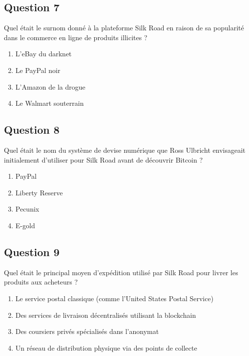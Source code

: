\documentclass[12pt,a4paper]{article}
\begin{document}
\bigskip


\subsection*{Question 7}
Quel était le surnom donné à la plateforme Silk Road en raison de sa popularité dans le commerce en ligne de produits illicites ?

\begin{enumerate}[label=\Alph*., leftmargin=*]
\item L'eBay du darknet
\item Le PayPal noir
\item L'Amazon de la drogue
\item Le Walmart souterrain
\end{enumerate}

\bigskip


\subsection*{Question 8}
Quel était le nom du système de devise numérique que Ross Ulbricht envisageait initialement d'utiliser pour Silk Road avant de découvrir Bitcoin ?

\begin{enumerate}[label=\Alph*., leftmargin=*]
\item PayPal
\item Liberty Reserve
\item Pecunix
\item E-gold
\end{enumerate}

\bigskip


\subsection*{Question 9}
Quel était le principal moyen d'expédition utilisé par Silk Road pour livrer les produits aux acheteurs ?

\begin{enumerate}[label=\Alph*., leftmargin=*]
\item Le service postal classique (comme l'United States Postal Service)
\item Des services de livraison décentralisés utilisant la blockchain
\item Des coursiers privés spécialisés dans l'anonymat
\item Un réseau de distribution physique via des points de collecte
\end{enumerate}
\end{document}
